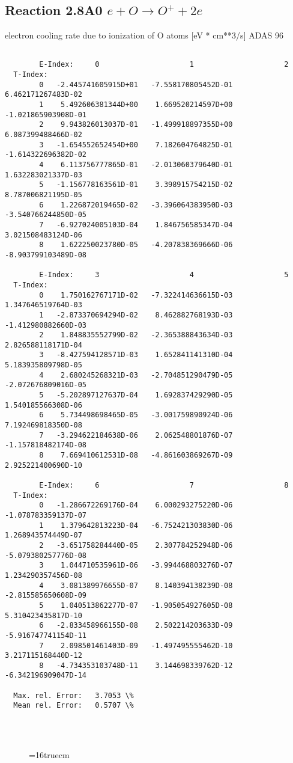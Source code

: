 \documentclass[12pt,dvipdfmx]{article}
\begin{document}
\subsection{
  Reaction 2.8A0  $e + O  \rightarrow O^+   + 2e $
}
electron cooling rate due to ionization of O atoms [eV * cm**3/s]
ADAS 96

\begin{small}\begin{verbatim}

        E-Index:     0                     1                     2
  T-Index:
        0   -2.445741605915D+01   -7.558170805452D-01    6.462171267483D-02
        1    5.492606381344D+00    1.669520214597D+00   -1.021865903908D-01
        2    9.943826013037D-01   -1.499918897355D+00    6.087399488466D-02
        3   -1.654552652454D+00    7.182604764825D-01   -1.614322696382D-02
        4    6.113756777865D-01   -2.013060379640D-01    1.632283021337D-03
        5   -1.156778163561D-01    3.398915754215D-02    8.787006821195D-05
        6    1.226872019465D-02   -3.396064383950D-03   -3.540766244850D-05
        7   -6.927024005103D-04    1.846756585347D-04    3.021508483124D-06
        8    1.622250023780D-05   -4.207838369666D-06   -8.903799103489D-08

        E-Index:     3                     4                     5
  T-Index:
        0    1.750162767171D-02   -7.322414636615D-03    1.347646519764D-03
        1   -2.873370694294D-02    8.462882768193D-03   -1.412980882660D-03
        2    1.848835552799D-02   -2.365388843634D-03    2.826588118171D-04
        3   -8.427594128571D-03    1.652841141310D-04    5.183935809798D-05
        4    2.680245268321D-03   -2.704851290479D-05   -2.072676809016D-05
        5   -5.202897127637D-04    1.692837429290D-05    1.540185566308D-06
        6    5.734498698465D-05   -3.001759890924D-06    7.192469818350D-08
        7   -3.294622184638D-06    2.062548801876D-07   -1.157818482174D-08
        8    7.669410612531D-08   -4.861603869267D-09    2.925221400690D-10

        E-Index:     6                     7                     8
  T-Index:
        0   -1.286672269176D-04    6.000293275220D-06   -1.078783359137D-07
        1    1.379642813223D-04   -6.752421303830D-06    1.268943574449D-07
        2   -3.651758284440D-05    2.307784252948D-06   -5.079380257776D-08
        3    1.044710535961D-06   -3.994468803276D-07    1.234290357456D-08
        4    3.081389976655D-07    8.140394138239D-08   -2.815585650608D-09
        5    1.040513862277D-07   -1.905054927605D-08    5.310423435817D-10
        6   -2.833458966155D-08    2.502214203633D-09   -5.916747741154D-11
        7    2.098501461403D-09   -1.497495555462D-10    3.217115168440D-12
        8   -4.734353103748D-11    3.144698339762D-12   -6.342196909047D-14

  Max. rel. Error:   3.7053 \%
  Mean rel. Error:   0.5707 \%




\end{verbatim}\end{small}
\begin{figure} \label{2.8il}
\epsfxsize=16truecm 
\end{figure}
\newpage
\end{document}
